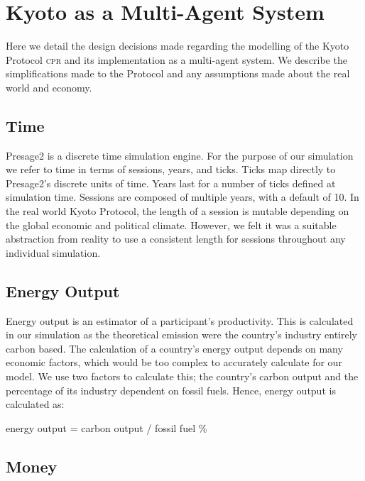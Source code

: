 \section{Kyoto as a Multi-Agent System}

Here we detail the design decisions made regarding the modelling of the Kyoto Protocol \textsc{cpr} and its implementation as a multi-agent system. We describe the simplifications made to the Protocol and any assumptions made about the real world and economy.

\subsection{Time}

Presage2 is a discrete time simulation engine. For the purpose of our simulation we refer to time in terms of sessions, years, and ticks. Ticks map directly to Presage2's discrete units of time. Years last for a number of ticks defined at simulation time. Sessions are composed of multiple years, with a default of 10. In the real world Kyoto Protocol, the length of a session is mutable depending on the global economic and political climate. However, we felt it was a suitable abstraction from reality to use a consistent length for sessions throughout any individual simulation.

\subsection{Energy Output}

Energy output is an estimator of a participant's productivity. This is calculated in our simulation as the theoretical \CO emission were the country's industry entirely carbon based. The calculation of a country's energy output depends on many economic factors, which would be too complex to accurately calculate for our model. We use two factors to calculate this; the country's carbon output and the percentage of its industry dependent on fossil fuels. Hence, energy output is calculated as: 

%
%

\begin{center}
energy output = carbon output / fossil fuel \%
\end{center}

%
%

\subsection{Money}

